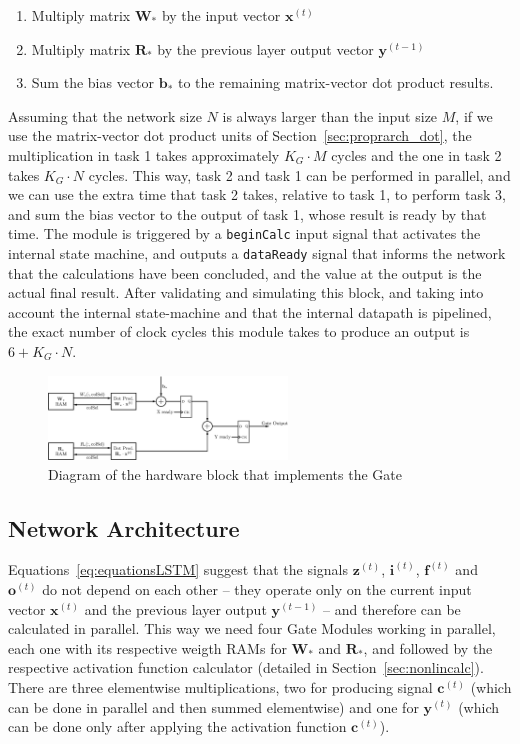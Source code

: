 \documentclass{IEEEtran}
\newcommand{\mb}[1]{\mathbf{#1}}
\begin{document}
\begin{enumerate}
    \item Multiply matrix $\mb{W}_*$ by the input vector $\mb{x}^{(t)}$
    \item Multiply matrix $\mb{R}_*$ by the previous layer output vector $\mb{y}^{(t-1)}$
    \item Sum the bias vector $\mb{b}_*$ to the remaining matrix-vector dot product results.
\end{enumerate}
Assuming that the network size $N$ is always larger than the input size $M$, if we use the matrix-vector dot product units of Section~\ref{sec:proprarch_dot}, the multiplication in task 1 takes approximately $K_G\cdot M$ cycles and the one in task 2 takes $K_G\cdot N$ cycles. This way, task 2 and task 1 can be performed in parallel, and we can use the extra time that task 2 takes, relative to task 1,  to perform task 3, and sum the bias vector to the output of task 1, whose result is ready by that time. The module is triggered by a \verb+beginCalc+ input signal that activates the internal state machine, and outputs a \verb+dataReady+ signal that informs the network that the calculations have been concluded, and the value at the output is the actual final result. 
After validating and simulating this block, and taking into account the internal state-machine and that the internal datapath is pipelined, the exact number of clock cycles this module takes to produce an output is $6+K_G\cdot N$.

\begin{figure}
    \centering
    \includegraphics[width=2.5in]{figures/gate.eps}
    \caption[Diagram of the hardware block that implements the Gate]{Diagram of the hardware block that implements the Gate}
    \label{fig:gate}
\end{figure}

\subsection{Network Architecture}\label{sec:proprarch_net}
Equations~\ref{eq:equationsLSTM} suggest that the signals $\mb{z}^{(t)}$, $\mb{i}^{(t)}$, $\mb{f}^{(t)}$ and $\mb{o}^{(t)}$ do not depend on each other -- they operate only on the current input vector $\mb{x}^{(t)}$ and the previous layer output $\mb{y}^{(t-1)}$ -- and therefore can be calculated in parallel. This way we need four Gate Modules working in parallel, each one with its respective weigth RAMs for $\mb{W}_*$ and $\mb{R}_*$, and followed by the respective activation function calculator (detailed in Section~\ref{sec:nonlincalc}). There are three elementwise multiplications, two for producing signal $\mb{c}^{(t)}$ (which can be done in parallel and then summed elementwise) and one for $\mb{y}^{(t)}$ (which can be done only after applying the activation function $\mb{c}^{(t)}$).
\end{document}
